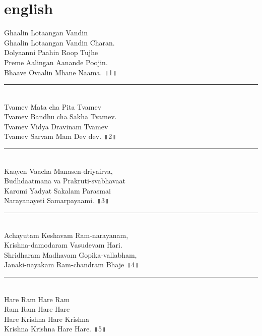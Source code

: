 \documentclass[letterpaper,twocolumn,openany,nodeprecatedcode]{dndbook}
\begin{document}
  \section*{english}
  Ghaalin Lotaangan Vandin \\
  Ghaalin Lotaangan Vandin Charan. \\
  Dolyaanni Paahin Roop Tujhe \\
  Preme Aalingan Aanande Poojin. \\
  Bhaave Ovaalin Mhane Naama. ॥1॥\\
  \rule{\linewidth}{1pt} \\
  Tvamev Mata cha Pita Tvamev \\
  Tvamev Bandhu cha Sakha Tvamev. \\
  Tvamev Vidya Dravinam Tvamev \\
  Tvamev Sarvam Mam Dev dev. ॥2॥\\
  \rule{\linewidth}{1pt} \\
  Kaayen Vaacha Manasen-driyairva, \\
  Budhdaatmana va Prakruti-svabhavaat \\
  Karomi Yadyat Sakalam Parasmai \\
  Narayanayeti Samarpayaami. ॥3॥\\
  \rule{\linewidth}{1pt} \\
  Achayutam Keshavam Ram-narayanam, \\
  Krishna-damodaram Vasudevam Hari. \\
  Shridharam Madhavam Gopika-vallabham, \\
  Janaki-nayakam Ram-chandram Bhaje ॥4॥ \\
  \rule{\linewidth}{1pt} \\
  Hare Ram Hare Ram \\
  Ram Ram Hare Hare \\
  Hare Krishna Hare Krishna \\
  Krishna Krishna Hare Hare. ॥5॥\\
  \pagebreak
\end{document}
